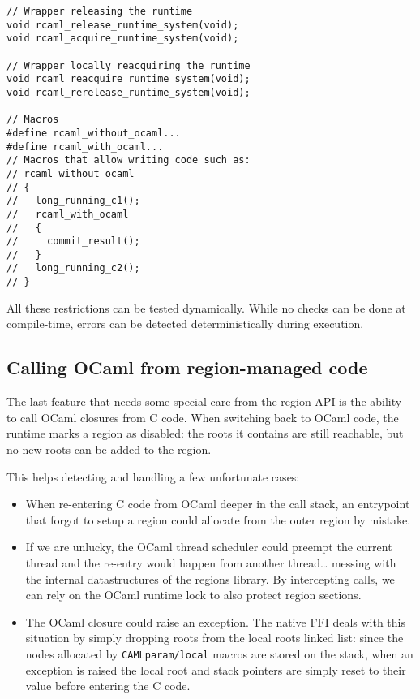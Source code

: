 \documentclass[a4paper]{easychair}
\begin{document}
\begin{lstlisting}[]
// Wrapper releasing the runtime
void rcaml_release_runtime_system(void);
void rcaml_acquire_runtime_system(void);

// Wrapper locally reacquiring the runtime
void rcaml_reacquire_runtime_system(void);
void rcaml_rerelease_runtime_system(void);

// Macros
#define rcaml_without_ocaml...
#define rcaml_with_ocaml...
// Macros that allow writing code such as:
// rcaml_without_ocaml
// {
//   long_running_c1();
//   rcaml_with_ocaml
//   {
//     commit_result();
//   }
//   long_running_c2();
// }
\end{lstlisting}

All these restrictions can be tested dynamically. While no checks can be
done at compile-time, errors can be detected deterministically during
execution.

\subsection{Calling OCaml from region-managed code}

The last feature that needs some special care from the region API is the
ability to call OCaml closures from C code. When switching back to OCaml
code, the runtime marks a region as disabled: the roots it contains are
still reachable, but no new roots can be added to the region.

This helps detecting and handling a few unfortunate cases:

\begin{itemize}
\item When re-entering C code from OCaml deeper in the call stack, an
      entrypoint that forgot to setup a region could allocate from the outer
      region by mistake.
\item If we are unlucky, the OCaml thread scheduler could preempt the
      current thread and the re-entry would happen from another
      thread\ldots{} messing with the internal datastructures of the regions
      library. By intercepting calls, we can rely on the OCaml runtime lock
      to also protect region sections.
\item The OCaml closure could raise an exception. The native FFI deals with
      this situation by simply dropping roots from the local roots linked
      list: since the nodes allocated by \texttt{CAMLparam/local} macros are
      stored on the stack, when an exception is raised the local root and
      stack pointers are simply reset to their value before entering the C
      code.
\end{itemize}
\end{document}
